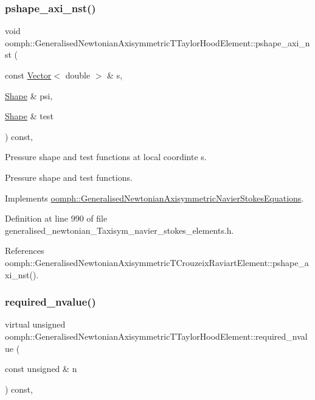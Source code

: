 \subsubsection{\texorpdfstring{pshape\+\_\+axi\+\_\+nst()}{pshape\_axi\_nst()}\hspace{0.1cm}{\footnotesize\ttfamily [2/2]}}
{\footnotesize\ttfamily void oomph\+::\+Generalised\+Newtonian\+Axisymmetric\+T\+Taylor\+Hood\+Element\+::pshape\+\_\+axi\+\_\+nst (\begin{DoxyParamCaption}\item[{const \hyperlink{classoomph_1_1Vector}{Vector}$<$ double $>$ \&}]{s,  }\item[{\hyperlink{classoomph_1_1Shape}{Shape} \&}]{psi,  }\item[{\hyperlink{classoomph_1_1Shape}{Shape} \&}]{test }\end{DoxyParamCaption}) const\hspace{0.3cm}{\ttfamily [inline]}, {\ttfamily [virtual]}}



Pressure shape and test functions at local coordinte s. 

Pressure shape and test functions. 

Implements \hyperlink{classoomph_1_1GeneralisedNewtonianAxisymmetricNavierStokesEquations_a278087089b3cd5b354b57b997ce7a224}{oomph\+::\+Generalised\+Newtonian\+Axisymmetric\+Navier\+Stokes\+Equations}.



Definition at line 990 of file generalised\+\_\+newtonian\+\_\+\+Taxisym\+\_\+navier\+\_\+stokes\+\_\+elements.\+h.



References oomph\+::\+Generalised\+Newtonian\+Axisymmetric\+T\+Crouzeix\+Raviart\+Element\+::pshape\+\_\+axi\+\_\+nst().

\mbox{\label{classoomph_1_1GeneralisedNewtonianAxisymmetricTTaylorHoodElement_a3605691c5cd063a0eed848f5f09465bb}} 
\subsubsection{\texorpdfstring{required\+\_\+nvalue()}{required\_nvalue()}}
{\footnotesize\ttfamily virtual unsigned oomph\+::\+Generalised\+Newtonian\+Axisymmetric\+T\+Taylor\+Hood\+Element\+::required\+\_\+nvalue (\begin{DoxyParamCaption}\item[{const unsigned \&}]{n }\end{DoxyParamCaption}) const\hspace{0.3cm}{\ttfamily [inline]}, {\ttfamily [virtual]}}




